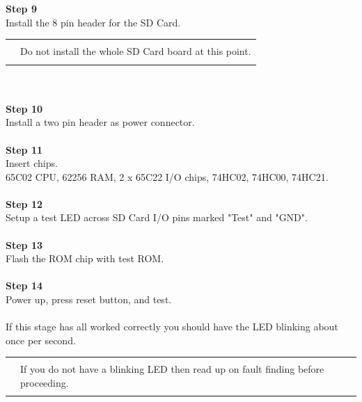 \documentclass{ol-softwaremanual}
\newcommand{\Note}[1]{
\begin{table}[h]
\begin{tabular}{|p{0.1\textwidth}p{0.8\textwidth}|}
\hline
 & \\
\multicolumn{1}{|r}{\Huge\warning} & #1\\
 &  \\ \hline
\end{tabular}
\end{table}
}
\begin{document}
\begin{ffcode}
\textbf{Step 9}\\
Install the 8 pin header for the SD Card.\\
\Note{Do not install the whole SD Card board at this point.}\\
\\
\textbf{Step 10}\\
Install a two pin header as power connector.\\
\\
\textbf{Step 11}\\
Insert chips.\\
65C02 CPU, 62256 RAM, 2 x 65C22 I/O chips, 74HC02, 74HC00, 74HC21.\\
\\
\textbf{Step 12}\\
Setup a test LED across SD Card I/O pins marked "Test" and "GND".\\
\\
\textbf{Step 13}\\
Flash the ROM chip with test ROM.\\
\\
\textbf{Step 14}\\
Power up, press reset button, and test.\\
\\
If this stage has all worked correctly you should have the LED blinking about once per second.
\Note{If you do not have a blinking LED then read up on fault finding before proceeding.}
\\
\pagebreak


\end{ffcode}
\end{document}
